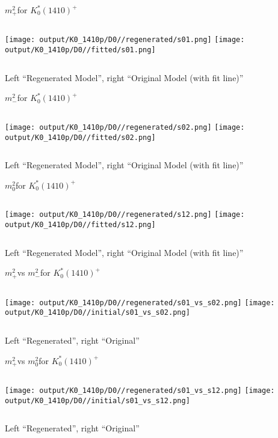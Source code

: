\documentclass{beamer}
\newcommand{\MP}{\ensuremath{m^2_+}}
\newcommand{\MM}{\ensuremath{m^2_-}}
\newcommand{\MZ}{\ensuremath{m^2_0}}
\begin{document}
\begin{frame}{\MP for $K_0^*(1410)^+$}
\begin{columns}[t]
\centering
\texttt{[image: output/K0\_1410p/D0//regenerated/s01.png]}
\centering
\texttt{[image: output/K0\_1410p/D0//fitted/s01.png]}
\end{columns}
    \centering
    Left ``Regenerated Model'', right ``Original Model (with fit line)''
\end{frame}                   

\begin{frame}{\MM for $K_0^*(1410)^+$}
\begin{columns}[t]
\centering
\texttt{[image: output/K0\_1410p/D0//regenerated/s02.png]}
\centering
\texttt{[image: output/K0\_1410p/D0//fitted/s02.png]}
\end{columns}
    \centering
    Left ``Regenerated Model'', right ``Original Model (with fit line)''
\end{frame}                   

\begin{frame}{\MZ for $K_0^*(1410)^+$}
\begin{columns}[t]
\centering
\texttt{[image: output/K0\_1410p/D0//regenerated/s12.png]}
\centering
\texttt{[image: output/K0\_1410p/D0//fitted/s12.png]}
\end{columns}
    \centering
    Left ``Regenerated Model'', right ``Original Model (with fit line)''
\end{frame}                   


\begin{frame}{\MP vs \MM for $K_0^*(1410)^+$}
\begin{columns}[t]
\centering
\texttt{[image: output/K0\_1410p/D0//regenerated/s01\_vs\_s02.png]}
\centering
\texttt{[image: output/K0\_1410p/D0//initial/s01\_vs\_s02.png]}
\end{columns}
    \centering
    Left ``Regenerated'', right ``Original''
\end{frame} 


\begin{frame}{\MP vs \MZ for $K_0^*(1410)^+$}
\begin{columns}[t]
\centering
\texttt{[image: output/K0\_1410p/D0//regenerated/s01\_vs\_s12.png]}
\centering
\texttt{[image: output/K0\_1410p/D0//initial/s01\_vs\_s12.png]}
\end{columns}
    \centering
    Left ``Regenerated'', right ``Original''
\end{frame} 
\end{document}
